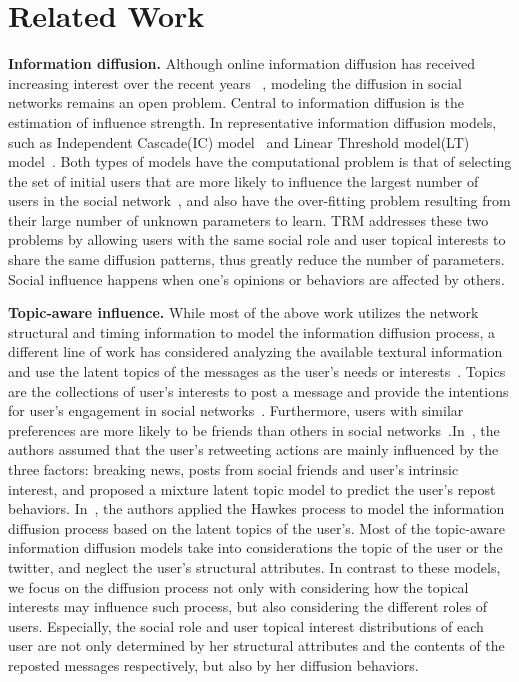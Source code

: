 \documentclass[runningheads,a4paper]{llncs}
\begin{document}
\section{Related Work}

\textbf{Information diffusion.} Although online information diffusion has received increasing interest over the recent years ~\cite{yang2015rain,Goldenberg2001Talk,granovetter1978threshold,xu2012modeling}, modeling the diffusion in social networks remains an open problem.
Central to information diffusion is the estimation of influence strength. In representative information diffusion models, such as Independent Cascade(IC) model~\cite{Goldenberg2001Talk} and Linear Threshold model(LT) model~\cite{granovetter1978threshold}. Both types of models have the computational problem is that of selecting the set of initial users that are more likely to influence the largest number of users in the social network~\cite{Barbieri2012Topic}, and also have the over-fitting problem resulting from their large number of unknown parameters to learn. TRM addresses these two problems by allowing users with the same social role and user topical interests to share the same diffusion patterns, thus greatly reduce the number of parameters.
Social influence happens when one's opinions or behaviors are affected by others.

\textbf{Topic-aware influence.} While most of the above work utilizes the network structural and timing information to model the information diffusion process, a different line of work has considered analyzing the available textural information and use the latent topics of the messages as the user's needs or interests~\cite{xiong2012information,Pinto2014Modeling,Barbieri2012Topic}. Topics are the collections of user's interests to post a message and provide the intentions for user's engagement in social networks~\cite{Pinto2014Modeling,xu2012modeling}. Furthermore, users with similar preferences are more likely to be friends than others in social networks~\cite{wahba1973maslow,burt2009structural}.In~\cite{xiong2012information}, the authors assumed that the user's retweeting actions are mainly influenced by the three factors: breaking news, posts from social friends and user's intrinsic interest, and proposed a mixture latent topic model to predict the user's repost behaviors. In~\cite{Pinto2014Modeling}, the authors applied the Hawkes process to model the information diffusion process based on the latent topics of the user's. Most of the topic-aware information diffusion models take into considerations the topic of the user or the twitter, and neglect the user's structural attributes. In contrast to these models, we focus on the diffusion process not only with considering how the topical interests may influence such process, but also considering the different roles of users. Especially, the social role and user topical interest distributions of each user are not only determined by her structural attributes and the contents of the reposted messages respectively, but also by her diffusion behaviors.
\end{document}
